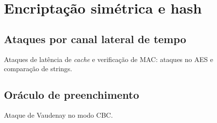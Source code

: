\section{Encriptação simétrica e hash}

\subsection{Ataques por canal lateral de tempo}

Ataques de latência de \emph{cache} e verificação de MAC:
ataques no AES e comparação de strings.

\subsection{Oráculo de preenchimento}

Ataque de Vaudenay no modo CBC.